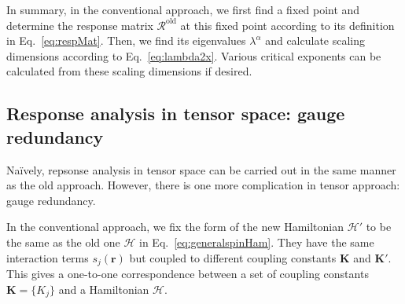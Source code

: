 \documentclass[aps,prb,reprint,superscriptaddress]{revtex4-2}
\begin{document}
In summary, in the conventional approach, we first find a fixed point
and determine the response matrix $\mathcal{R}^{\text{old}}$ at this
fixed point according to its definition in Eq.~\eqref{eq:respMat}. Then,
we find its eigenvalues $\lambda^{\alpha}$ and calculate scaling
dimensions according to Eq.~\eqref{eq:lambda2x}. Various critical
exponents can be calculated from these scaling dimensions if desired. 

\subsection{Response analysis in tensor space: gauge redundancy}
Na\"ively, repsonse analysis in tensor space can be carried out
in the same manner as the old approach. However, there is one more
complication in tensor approach: gauge redundancy.
%

In the conventional approach, we fix the form of the new Hamiltonian
$\mathcal{H}'$ to be the same as the old one $\mathcal{H}$ in
Eq.~\eqref{eq:generalspinHam}. They have the same interaction terms
$s_j(\mathbf{r})$ but coupled to different coupling constants
$\mathbf{K}$ and $\mathbf{K}'$. This gives a one-to-one correspondence
between a set of coupling constants $\mathbf{K} = \{K_j \}$ and a
Hamiltonian $\mathcal{H}$.
\end{document}

